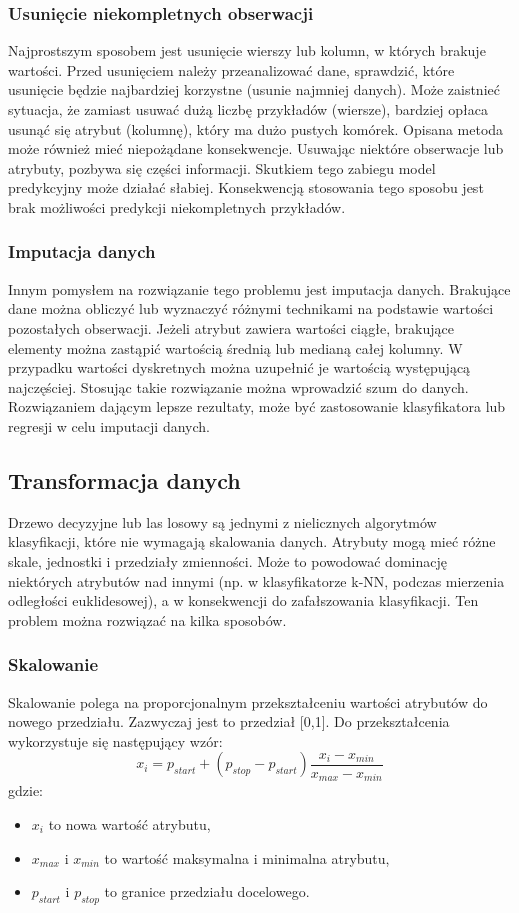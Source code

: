 \subsubsection{Usunięcie niekompletnych obserwacji}
Najprostszym sposobem jest usunięcie wierszy lub kolumn, w których brakuje wartości. Przed usunięciem należy przeanalizować dane, sprawdzić, które usunięcie będzie najbardziej korzystne (usunie najmniej danych). Może zaistnieć sytuacja, że zamiast usuwać dużą liczbę przykładów (wiersze), bardziej opłaca usunąć się atrybut (kolumnę), który ma dużo pustych komórek. Opisana metoda może również mieć niepożądane konsekwencje. Usuwając niektóre obserwacje lub atrybuty, pozbywa się części informacji. Skutkiem tego zabiegu model predykcyjny może działać słabiej. Konsekwencją stosowania tego sposobu jest brak możliwości predykcji niekompletnych przykładów.
\subsubsection{Imputacja danych}
Innym pomysłem na rozwiązanie tego problemu jest imputacja danych. Brakujące dane można obliczyć lub wyznaczyć różnymi technikami na podstawie wartości pozostałych obserwacji. Jeżeli atrybut zawiera wartości ciągłe, brakujące elementy można zastąpić wartością średnią lub medianą całej kolumny. W przypadku wartości dyskretnych można uzupełnić je wartością występującą najczęściej. Stosując takie rozwiązanie można wprowadzić szum do danych. Rozwiązaniem dającym lepsze rezultaty, może być zastosowanie klasyfikatora lub regresji w celu imputacji danych.
\subsection{Transformacja danych}
Drzewo decyzyjne lub las losowy są jednymi z nielicznych algorytmów klasyfikacji, które nie wymagają skalowania danych. Atrybuty mogą mieć różne skale, jednostki i przedziały zmienności. Może to powodować dominację niektórych atrybutów nad innymi (np. w klasyfikatorze k-NN, podczas mierzenia odległości euklidesowej), a w konsekwencji do zafałszowania klasyfikacji. Ten problem można rozwiązać na kilka sposobów.
\subsubsection{Skalowanie}
Skalowanie polega na proporcjonalnym przekształceniu wartości atrybutów do nowego przedziału. Zazwyczaj jest to przedział [0,1]. Do przekształcenia wykorzystuje się następujący wzór:
\[x_i=p_{start}+(p_{stop}-p_{start})\frac{x_i-x_{min}}{x_{max}-x_{min}}\]
gdzie:
\begin{itemize}
	\item $x_i$ to nowa wartość atrybutu,
	\item $x_{max}$ i $x_{min}$ to wartość maksymalna i minimalna atrybutu,
	\item $p_{start}$ i $p_{stop}$ to granice przedziału docelowego.
\end{itemize}
